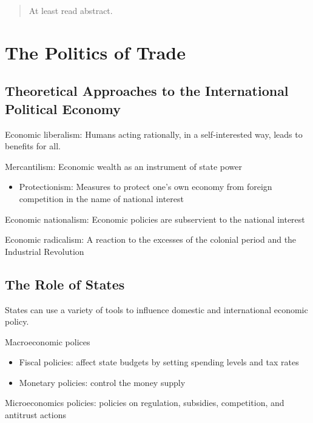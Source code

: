 \documentclass[
]{book}
\providecommand{\tightlist}{%
  \setlength{\itemsep}{0pt}\setlength{\parskip}{0pt}}
\begin{document}
\begin{quote}
At least read abstract.
\end{quote}

\hypertarget{the-politics-of-trade}{%
\chapter{The Politics of Trade}\label{the-politics-of-trade}}

\hypertarget{theoretical-approaches-to-the-international-political-economy}{%
\section{Theoretical Approaches to the International Political Economy}\label{theoretical-approaches-to-the-international-political-economy}}

Economic liberalism: Humans acting rationally, in a self-interested way, leads to benefits for all.

Mercantilism: Economic wealth as an instrument of state power

\begin{itemize}
\tightlist
\item
  Protectionism: Measures to protect one's own economy from foreign competition in the name of national interest
\end{itemize}

Economic nationalism: Economic policies are subservient to the national interest

Economic radicalism: A reaction to the excesses of the colonial period and the Industrial Revolution

\hypertarget{the-role-of-states}{%
\section{The Role of States}\label{the-role-of-states}}

States can use a variety of tools to influence domestic and international economic policy.

Macroeconomic polices

\begin{itemize}
\item
  Fiscal policies: affect state budgets by setting spending levels and tax rates
\item
  Monetary policies: control the money supply
\end{itemize}

Microeconomics policies: policies on regulation, subsidies, competition, and antitrust actions
\end{document}
